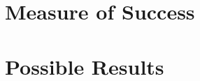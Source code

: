 \section{Measure of Success}
\label{cha:success}


\section{Possible Results}
\label{cha:conclusion}